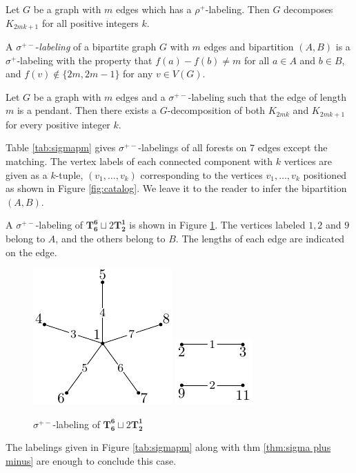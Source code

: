 \begin{thm} \label{thm:rho plus}
Let $G$ be a graph with $m$ edges which has a $\rho^+$-labeling. Then $G$ decomposes $K_{2mk+1}$ for all positive integers $k$.
\end{thm}

\begin{definition} \label{def:sigma plus minus} 
A $\sigma^{+-}$-\emph{labeling} of a bipartite graph $G$ with $m$ edges and bipartition $(A,B)$ is a $\sigma^+$-labeling with the property that $f(a) - f(b) \neq m$ for all $a \in A$ and $b \in B$, and $f(v) \not\in \{2m,2m-1\}$ for any $v\in V(G)$.
\end{definition}

\begin{thm} \label{thm:sigma plus minus}
Let $G$ be a graph with $m$ edges and a $\sigma^{+-}$-labeling such that the edge of length $m$ is a pendant. Then there exists a $G$-decomposition of both $K_{2mk}$ and $K_{2mk+1}$ for every positive integer $k$.
\end{thm}

Table \ref{tab:sigmapm} gives $\sigma^{+-}$-labelings of all forests on 7 edges except the matching. The vertex labels of each connected component with $k$ vertices are given as a $k$-tuple, $(v_1,\dots ,v_k)$ corresponding to the vertices $v_1, \dots, v_k$ positioned as shown in Figure \ref{fig:catalog}. We leave it to the reader to infer the bipartition $(A,B)$. 
\begin{example}
    A $\sigma^{+-}$-labeling of $\mathbf{T_{6}^{6}}\sqcup 2\mathbf{T_{2}^{1}}$ is shown in Figure \ref{fig:sigma label ex}. The vertices labeled $1,2$ and $9$ belong to $A$, and the others belong to $B$. The lengths of each edge are indicated on the edge.
    \begin{figure}[H]
        \centering
        \includegraphics[scale=1.0]{standalone/sigma label ex1.pdf}
         \includegraphics[scale=1.0]{standalone/sigma label ex2.pdf}
        \caption{$\sigma^{+-}$-labeling of $\mathbf{T_{6}^{6}}\sqcup 2\mathbf{T_{2}^{1}}$}
        \label{fig:sigma label ex}
    \end{figure}
\end{example}
 The labelings given in Figure \ref{tab:sigmapm} along with thm \ref{thm:sigma plus minus} are enough to conclude this case.

